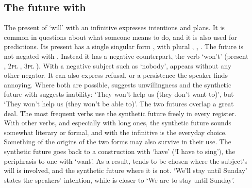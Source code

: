 \subsection{The future with }\label{sec:vol-future}
The present of  `will' with an infinitive expresses intentions and plans. It is common in questions about what someone means to do, and it is also used for predictions. Its present has a single singular form , with plural , , .
The  future is not negated with . Instead it has a negative counterpart, the verb  `won't' (present , 2\textsc{pl} , 3\textsc{pl} ). With a negative subject such as  `nobody',  appears without any other negator. It can also express refusal, or a persistence the speaker finds annoying. Where both are possible,  suggests unwillingness and the synthetic future with  suggests inability:  `They won't help us (they don't want to)', but  `They won't help us (they won't be able to)'.
The two futures overlap a great deal. The most frequent verbs use the synthetic future freely in every register. With other verbs, and especially with long ones, the synthetic future sounds somewhat literary or formal, and  with the infinitive is the everyday choice. Something of the origins of the two forms may also survive in their use. The synthetic future goes back to a construction with `have' (`I have to sing'), the periphrasis to one with `want'. As a result,  tends to be chosen where the subject's will is involved, and the synthetic future where it is not.  `We'll stay until Sunday' states the speakers' intention, while  is closer to `We are to stay until Sunday'.
